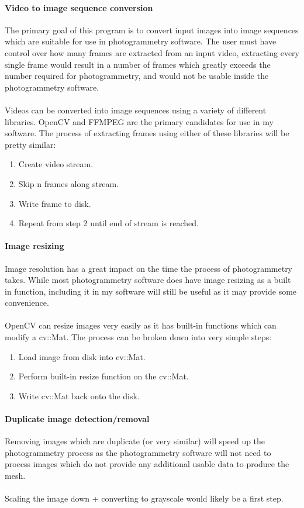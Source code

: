 \documentclass[11pt]{report}
\begin{document}
\paragraph{Video to image sequence conversion}
The primary goal of this program is to convert input images into image sequences which are suitable for use in photogrammetry software.
The user must have control over how many frames are extracted from an input video, extracting every single frame would result in a number of frames which greatly exceeds the number required for photogrammetry, and would not be usable inside the photogrammetry software.\\\\
Videos can be converted into image sequences using a variety of different libraries. OpenCV and FFMPEG are the primary candidates for use in my software. The process of extracting frames using either of these libraries will be pretty similar:
\begin{enumerate}
\item Create video stream.
\item Skip n frames along stream.
\item Write frame to disk.
\item Repeat from step 2 until end of stream is reached.
\end{enumerate}

\paragraph{Image resizing}
Image resolution has a great impact on the time the process of photogrammetry takes. While most photogrammetry software does have image resizing as a built in function, including it in my software will still be useful as it may provide some convenience.\\\\
OpenCV can resize images very easily as it has built-in functions which can modify a cv::Mat. The process can be broken down into very simple steps:
\begin{enumerate}
\item Load image from disk into cv::Mat.
\item Perform built-in resize function on the cv::Mat.
\item Write cv::Mat back onto the disk.
\end{enumerate}

\paragraph{Duplicate image detection/removal}
Removing images which are duplicate (or very similar) will speed up the photogrammetry process as the photogrammetry software will not need to process images which do not provide any additional usable data to produce the mesh.\\\\
Scaling the image down + converting to grayscale would likely be a first step.
\end{document}
